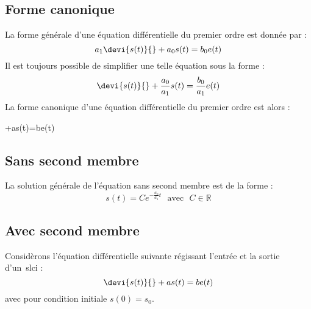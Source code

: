 \subsection{Forme canonique}
La forme générale d'une équation différentielle du premier ordre est
donnée par : 
\[
a_1\devi{s(t)}{}+a_0s(t)=b_0e(t)
\]
Il est toujours possible de simplifier une telle équation sous la forme :
\[
\devi{s(t)}{}+\dfrac{a_0}{a_1}s(t)=\dfrac{b_0}{a_1}e(t)
\]
La forme canonique d'une équation différentielle du premier ordre est alors :
\begin{bequation}
+as(t)=be(t)
\end{bequation}
\subsection{Sans second membre}
La solution générale de l'équation sans second membre est de la forme :
\[
s(t) = C e^{-\frac{a_0}{a_1}t}\,\,\,\,\text{avec}\,\,\,\,C\in\mathbb{R}
\]
\subsection{Avec second membre}
Considèrons l'équation différentielle suivante régissant l'entrée
et la sortie d'un~\gls{slci} :
\[
\devi{s(t)}{}+as(t)=be(t)
\]
avec pour condition initiale $s(0)=s_0$.

